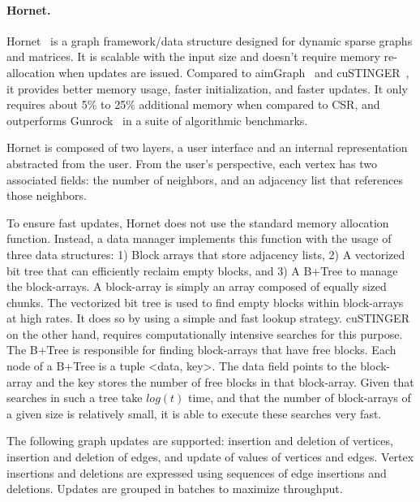     \paragraph{\textbf{Hornet}.}
    Hornet~\cite{paper:hornet} is a graph framework/data structure designed for dynamic sparse graphs and matrices. It is scalable with the input size and doesn't require memory re-allocation when updates are issued. Compared to aimGraph~\cite{paper:aimgraph} and cuSTINGER~\cite{paper:custinger}, it provides better memory usage, faster initialization, and faster updates. It only requires about 5\% to 25\% additional memory when compared to \gls{CSR}, and outperforms Gunrock~\cite{paper:gunrock} in a suite of algorithmic benchmarks.

    Hornet is composed of two layers, a user interface and an internal representation abstracted from the user. From the user's perspective, each vertex has two associated fields: the number of neighbors, and an adjacency list that references those neighbors.
    
    To ensure fast updates, Hornet does not use the standard memory allocation function. Instead, a data manager implements this function with the usage of three data structures: 1) Block arrays that store adjacency lists, 2) A vectorized bit tree that can efficiently reclaim empty blocks, and 3) A B+Tree to manage the block-arrays. A block-array is simply an array composed of equally sized chunks. The vectorized bit tree is used to find empty blocks within block-arrays at high rates. It does so by using a simple and fast lookup strategy. cuSTINGER on the other hand, requires computationally intensive searches for this purpose. The B+Tree is responsible for finding block-arrays that have free blocks. Each node of a B+Tree is a tuple <data, key>. The data field points to the block-array and the key stores the number of free blocks in that block-array. Given that searches in such a tree take $log(t)$ time, and that the number of block-arrays of a given size is relatively small, it is able to execute these searches very fast.
    
    The following graph updates are supported: insertion and deletion of vertices, insertion and deletion of edges, and update of values of vertices and edges. Vertex insertions and deletions are expressed using sequences of edge insertions and deletions. Updates are grouped in batches to maximize throughput.

